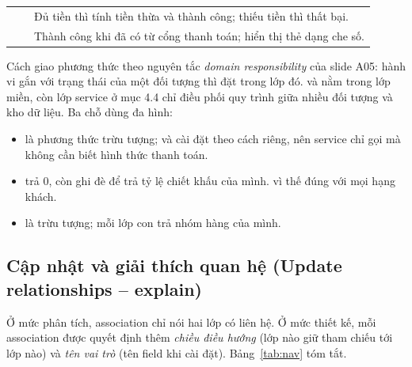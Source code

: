 \documentclass[12pt,a4paper]{article}
\begin{document}
\begin{longtable}{@{}P{2.4cm}P{6.6cm}P{6.9cm}@{}}
\small{} & \small{} & \small Đủ tiền thì tính tiền thừa và thành công; thiếu tiền thì thất bại.\\
\small{} & \small{}\newline{} & \small Thành công khi đã có  từ cổng thanh toán; hiển thị thẻ dạng che số.\\
\bottomrule
\end{longtable}

Cách giao phương thức theo nguyên tắc \emph{domain responsibility} của slide A05: hành vi gắn với trạng
thái của một đối tượng thì đặt trong lớp đó.  và  nằm
trong lớp miền, còn lớp service ở mục 4.4 chỉ điều phối quy trình giữa nhiều đối tượng và kho dữ liệu.
Ba chỗ dùng đa hình:
\begin{itemize}
\item {} là phương thức trừu tượng;  và  cài đặt theo
cách riêng, nên service chỉ gọi  mà không cần biết hình thức thanh toán.
\item {} trả 0, còn  ghi đè để trả tỷ lệ chiết khấu của
mình.  vì thế đúng với mọi hạng khách.
\item {} là trừu tượng; mỗi lớp con trả nhóm hàng của mình.
\end{itemize}

\subsection{Cập nhật và giải thích quan hệ (Update relationships -- explain)}

Ở mức phân tích, association chỉ nói hai lớp có liên hệ. Ở mức thiết kế, mỗi association được quyết định
thêm \emph{chiều điều hướng} (lớp nào giữ tham chiếu tới lớp nào) và \emph{tên vai trò} (tên field khi cài
đặt). Bảng~\ref{tab:nav} tóm tắt.
\end{document}
